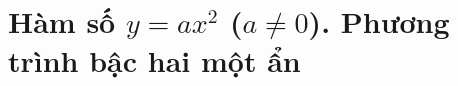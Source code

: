 \setcounter{chapter}{5}
\chapter{Hàm số $y=ax^2$ ($a\ne0$). Phương trình bậc hai một ẩn}

\setcounter{section}{17}







